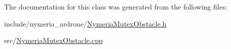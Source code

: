 The documentation for this class was generated from the following files\+:\begin{DoxyCompactItemize}
\item 
include/nymeria\+\_\+ardrone/\hyperlink{_nymeria_mutex_obstacle_8h}{Nymeria\+Mutex\+Obstacle.\+h}\item 
src/\hyperlink{_nymeria_mutex_obstacle_8cpp}{Nymeria\+Mutex\+Obstacle.\+cpp}\end{DoxyCompactItemize}

